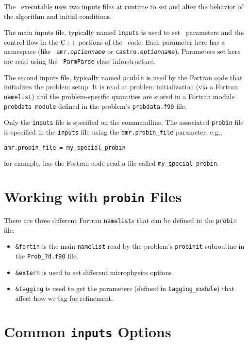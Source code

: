 The \castro\ executable uses two inputs files at runtime to set and alter the
behavior of the algorithm and initial conditions.

The main inputs file, typically named {\tt inputs} is used to
set \boxlib\ parameters and the control flow in the C++ portions of
the \castro\ code.  Each parameter here has a namespace (like {\tt
amr.{\em optionname}} or {\tt castro.{\em optionname}}).  Parameters
set here are read using the \boxlib\ {\tt ParmParse} class
infrastructure.

The second inputs file, typically named {\tt probin} is used by the
Fortran code that initializes the problem setup.  It is read at
problem initialization (via a Fortran {\tt namelist}) and the
problem-specific quantities are stored in a Fortran module {\tt
probdata\_module} defined in the problem's {\tt probdata.f90} file.

Only the {\tt inputs} file is specified on the commandline.  The
associated {\tt probin} file is specified in the {\tt inputs} file
using the {\tt amr.probin\_file} parameter, e.g.,
\begin{lstlisting}
amr.probin_file = my_special_probin
\end{lstlisting}
for example, has the Fortran code read a file called {\tt my\_special\_probin}.

\section{Working with {\tt probin} Files}

There are three different Fortran {\tt namelist}s that can be defined in the
{\tt probin} file:
\begin{itemize}
\item {\tt \&fortin} is the main {\tt namelist} read by the problem's {\tt probinit}
subroutine in the {\tt Prob\_?d.f90} file.

\item {\tt \&extern} is used to set different microphysics options

\item {\tt \&tagging} is used to get the parameters (defined in {\tt tagging\_module})
that affect how we tag for refinement.
\end{itemize}

\section{Common {\tt inputs} Options}

